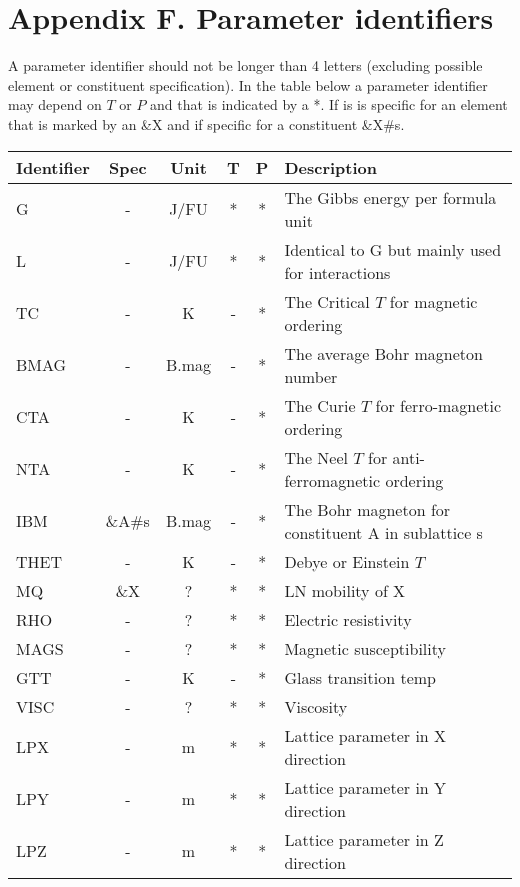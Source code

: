 \documentclass[12pt]{article}
\begin{document}
\newpage

\section{Appendix F.  Parameter identifiers}

A parameter identifier should not be longer than 4 letters (excluding
possible element or constituent specification).  In the table below a
parameter identifier may depend on $T$ or $P$ and that is indicated by
a *.  If is is specific for an element that is marked by an \&X and if
specific for a constituent \&X\#s.

\begin{tabular}{lccccl}
Identifier & Spec & Unit & T & P & Description\\\hline
G          & -    & J/FU & * & * &The Gibbs energy per formula unit\\
L          & -    & J/FU & * & * &Identical to G but mainly used for interactions\\ 
TC         & -    & K    & - & * & The Critical $T$ for magnetic ordering\\
BMAG       & -    & B.mag& - & * & The average Bohr magneton number\\
CTA        & -    & K    & - & * & The Curie $T$ for ferro-magnetic ordering\\
NTA        & -    & K    & - & * & The Neel $T$ for anti-ferromagnetic ordering\\
IBM        & \&A\#s &B.mag&- & * & The Bohr magneton for constituent A in sublattice s\\
THET       & - & K & - & * & Debye or Einstein $T$\\
MQ         & \&X  & ? & * & * & LN mobility of X \\
RHO        & - & ? & * & * & Electric resistivity\\
MAGS  & - & ? & * & * & Magnetic susceptibility\\
GTT   & - & K & - & * & Glass transition temp\\
VISC  & - & ? & * & * & Viscosity\\
LPX   & - & m & * & * & Lattice parameter in X direction\\
LPY   & - & m & * & * & Lattice parameter in Y direction\\
LPZ   & - & m & * & * & Lattice parameter in Z direction\\

\end{tabular}
\end{document}
